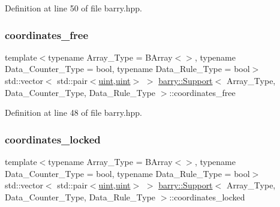 Definition at line 50 of file barry.\+hpp.

\mbox{\label{classbarry_1_1_support_aa235837435a5ed7ac540481676333b88}} 
\subsubsection{\texorpdfstring{coordinates\+\_\+free}{coordinates\_free}}
{\footnotesize\ttfamily template$<$typename Array\+\_\+\+Type = B\+Array$<$$>$, typename Data\+\_\+\+Counter\+\_\+\+Type = bool, typename Data\+\_\+\+Rule\+\_\+\+Type = bool$>$ \\
std\+::vector$<$ std\+::pair$<$\hyperlink{namespacebarry_a11dfc53ddb4672278319aa04f1e09a6c}{uint},\hyperlink{namespacebarry_a11dfc53ddb4672278319aa04f1e09a6c}{uint}$>$ $>$ \hyperlink{classbarry_1_1_support}{barry\+::\+Support}$<$ Array\+\_\+\+Type, Data\+\_\+\+Counter\+\_\+\+Type, Data\+\_\+\+Rule\+\_\+\+Type $>$\+::coordinates\+\_\+free}



Definition at line 48 of file barry.\+hpp.

\mbox{\label{classbarry_1_1_support_a3abcd564b19c7399b596a5b63c72b149}} 
\subsubsection{\texorpdfstring{coordinates\+\_\+locked}{coordinates\_locked}}
{\footnotesize\ttfamily template$<$typename Array\+\_\+\+Type = B\+Array$<$$>$, typename Data\+\_\+\+Counter\+\_\+\+Type = bool, typename Data\+\_\+\+Rule\+\_\+\+Type = bool$>$ \\
std\+::vector$<$ std\+::pair$<$\hyperlink{namespacebarry_a11dfc53ddb4672278319aa04f1e09a6c}{uint},\hyperlink{namespacebarry_a11dfc53ddb4672278319aa04f1e09a6c}{uint}$>$ $>$ \hyperlink{classbarry_1_1_support}{barry\+::\+Support}$<$ Array\+\_\+\+Type, Data\+\_\+\+Counter\+\_\+\+Type, Data\+\_\+\+Rule\+\_\+\+Type $>$\+::coordinates\+\_\+locked}



